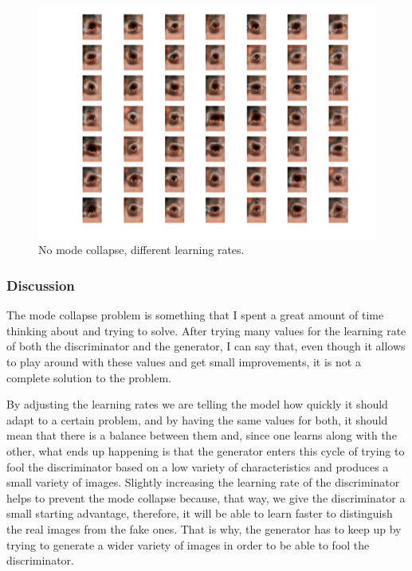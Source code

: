\documentclass[12pt,a4paper,oneside]{memoir}
\begin{document}
\begin{figure}[H]
\centering
\includegraphics[width=1\textwidth]{images/No_collapse.png}
\caption{No mode collapse, different learning rates.}
\centering
\label{fig:nocola}
\end{figure}
 

\subsubsection{Discussion}
The mode collapse problem is something that I spent a great amount of time thinking about and trying to solve. After trying many values for the learning rate of both the discriminator and the generator, I can say that, even though it allows to play around with these values and get small improvements, it is not a complete solution to the problem. 


\par 

By adjusting the learning rates we are telling the model how quickly it should adapt to a certain problem, and by having the same values for both, it should mean that there is a balance between them and, since one learns along with the other, what ends up happening is that the generator enters this cycle of trying to fool the discriminator based on a low variety of characteristics and produces a small variety of images. Slightly increasing the learning rate of the discriminator helps to prevent the mode collapse because, that way, we give the discriminator a small starting advantage, therefore, it will be able to learn faster to distinguish the real images from the fake ones. That is why, the generator has to keep up by trying to generate a wider variety of images in order to be able to fool the discriminator.
\end{document}
